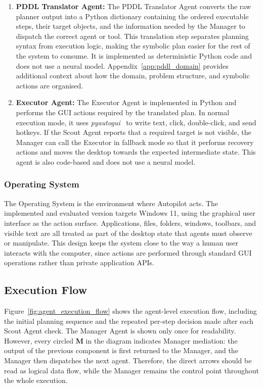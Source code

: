 \begin{enumerate}
  \item \textbf{PDDL Translator Agent:} The PDDL Translator Agent converts the raw planner output into a Python dictionary containing the ordered executable steps, their target objects, and the information needed by the Manager to dispatch the correct agent or tool. This translation step separates planning syntax from execution logic, making the symbolic plan easier for the rest of the system to consume. It is implemented as deterministic Python code and does not use a neural model. Appendix~\ref{app:pddl_domain} provides additional context about how the domain, problem structure, and symbolic actions are organised.

  \item \textbf{Executor Agent:} The Executor Agent is implemented in Python and performs the GUI actions required by the translated plan. In normal execution mode, it uses \textit{pyautogui}~\cite{pyautogui} to write text, click, double-click, and send hotkeys. If the Scout Agent reports that a required target is not visible, the Manager can call the Executor in fallback mode so that it performs recovery actions and moves the desktop towards the expected intermediate state. This agent is also code-based and does not use a neural model.
\end{enumerate}

\subsubsection{Operating System}

The Operating System is the environment where Autopilot acts. The implemented and evaluated version targets Windows 11, using the graphical user interface as the action surface. Applications, files, folders, windows, toolbars, and visible text are all treated as part of the desktop state that agents must observe or manipulate. This design keeps the system close to the way a human user interacts with the computer, since actions are performed through standard GUI operations rather than private application APIs.

\subsection{Execution Flow}

Figure~\ref{fig:agent_execution_flow} shows the agent-level execution flow, including the initial planning sequence and the repeated per-step decision made after each Scout Agent check. The Manager Agent is shown only once for readability. However, every circled \textbf{M} in the diagram indicates Manager mediation: the output of the previous component is first returned to the Manager, and the Manager then dispatches the next agent. Therefore, the direct arrows should be read as logical data flow, while the Manager remains the control point throughout the whole execution.

